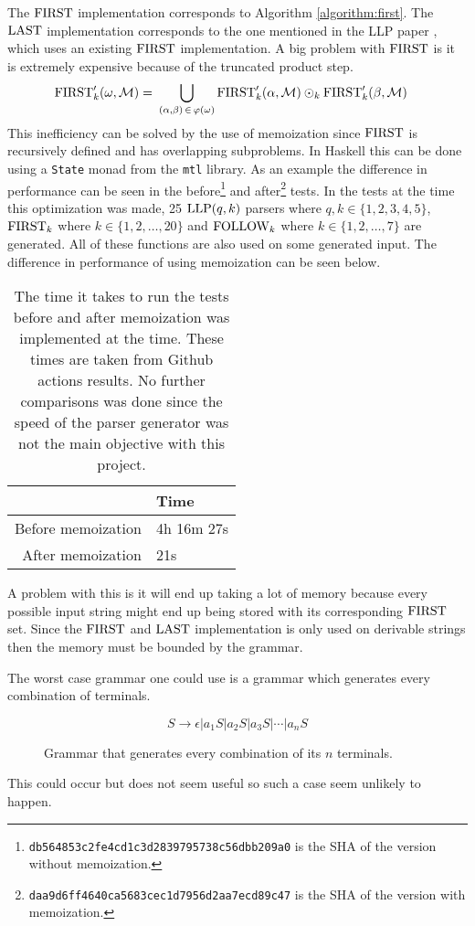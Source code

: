 The $\text{FIRST}$ implementation corresponds to Algorithm \ref{algorithm:first}. The $\text{LAST}$ implementation corresponds to the one mentioned in the LLP paper \cite[12]{Vagner2007}, which uses an existing $\text{FIRST}$ implementation. A big problem with $\text{FIRST}$ is it is extremely expensive because of the truncated product step.
\begin{align*}
    \text{FIRST}'_k(\omega, \mathcal{M}) =&\,\, \bigcup_{(\alpha, \beta) \, \in \, \varphi(\omega)} \text{FIRST}'_k(\alpha, \mathcal{M}) \odot_k \text{FIRST}'_k(\beta, \mathcal{M})
\end{align*}
This inefficiency can be solved by the use of memoization since $\text{FIRST}$ is recursively defined and has overlapping subproblems. In Haskell this can be done using a \lstinline|State| monad from the \lstinline|mtl| library. As an example the difference in performance can be seen in the before\footnote{\texttt{db564853c2fe4cd1c3d2839795738c56dbb209a0} is the SHA of the version without memoization.} and after\footnote{\texttt{daa9d6ff4640ca5683cec1d7956d2aa7ecd89c47} is the SHA of the version with memoization.} tests. In the tests at the time this optimization was made, 25 $\text{LLP}(q,k)$ parsers where $q, k \in \{1, 2, 3, 4, 5\}$, $\text{FIRST}_k$ where $k \in \{1, 2, \dots, 20\}$ and $\text{FOLLOW}_k$ where $k \in \{1, 2, \dots, 7\}$ are generated. All of these functions are also used on some generated input. The difference in performance of using memoization can be seen below. 
\begin{table}[H]
    \centering
    \begin{tabular}{r|l}
         & Time \\ \hline
        Before memoization & 4h 16m 27s \\
        After memoization & 21s
    \end{tabular}
    \caption{The time it takes to run the tests before and after memoization was implemented at the time. These times are taken from Github actions results. No further comparisons was done since the speed of the parser generator was not the main objective with this project.}
\end{table}
\noindent A problem with this is it will end up taking a lot of memory because every possible input string might end up being stored with its corresponding $\text{FIRST}$ set. Since the $\text{FIRST}$ and $\text{LAST}$ implementation is only used on derivable strings then the memory must be bounded by the grammar.

The worst case grammar one could use is a grammar which generates every combination of terminals.
\begin{figure}
    \begin{equation*}
        \label{fig:combination-grammar}
        S \to \epsilon | a_1 S | a_2 S | a_3 S | \cdots | a_n S
    \end{equation*}
    \caption{Grammar that generates every combination of its $n$ terminals.}    
\end{figure}
This could occur but does not seem useful so such a case seem unlikely to happen.